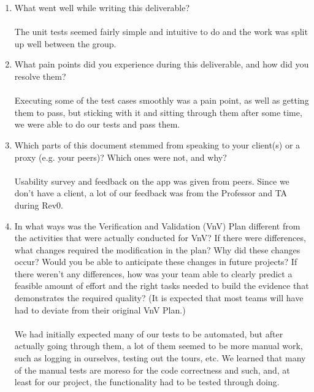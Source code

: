 \documentclass[12pt, titlepage]{article}
\begin{document}
\begin{enumerate}
  \item What went well while writing this deliverable?\\ \\
  The unit tests seemed fairly simple and intuitive to do and the work was split up well between the group.
  \item What pain points did you experience during this deliverable, and how
        did you resolve them?\\ \\
    Executing some of the test cases smoothly was a pain point, as well as getting them to pass, but sticking with it and sitting through them after some time, we were able to do our tests and pass them.
  \item Which parts of this document stemmed from speaking to your client(s) or
        a proxy (e.g. your peers)? Which ones were not, and why?\\ \\
        Usability survey and feedback on the app was given from peers. Since we don't have a client, a lot of our feedback was from the Professor and TA during Rev0.
  \item In what ways was the Verification and Validation (VnV) Plan different
        from the activities that were actually conducted for VnV?  If there were
        differences, what changes required the modification in the plan?  Why did
        these changes occur?  Would you be able to anticipate these changes in future
        projects?  If there weren't any differences, how was your team able to clearly
        predict a feasible amount of effort and the right tasks needed to build the
        evidence that demonstrates the required quality?  (It is expected that most
        teams will have had to deviate from their original VnV Plan.)\\ \\
        We had initially expected many of our tests to be automated, but after actually going through them, a lot of them seemed to be more manual work, such as logging in ourselves, testing out the tours, etc. We learned that many of the manual tests are moreso for the code correctness and such, and, at least for our project, the functionality had to be tested through doing.
\end{enumerate}
\end{document}
